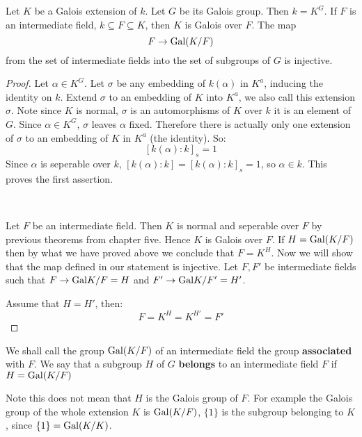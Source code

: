 \begin{theorem}
    Let $K$ be a Galois extension of $k$. Let $G$ be its Galois group. Then $k=K^G$. If $F$ is an intermediate field, $k\subseteq F\subseteq K$, then $K$ is Galois over $F$. The map\[F\rightarrow \text{Gal}(K/F)\]from the set of intermediate fields into the set of subgroups of $G$ is injective.

    \begin{proof}
        Let $\alpha\in K^G$. Let $\sigma$ be any embedding of $k(\alpha)$ in $K^a$, inducing the identity on $k$. Extend $\sigma$ to an embedding of $K$ into $K^a$, we also call this extension $\sigma$. Note since $K$ is normal, $\sigma$ is an automorphisms of $K$ over $k$ it is an element of $G$. Since $\alpha\in K^G$, $\sigma$ leaves $\alpha$ fixed. Therefore there is actually only one extension of $\sigma$ to an embedding of $K$ in $K^a$ (the identity). So:\[{[k(\alpha)\colon k]}_s = 1 \] 
        Since $\alpha$ is seperable over $k$, $[k(\alpha)\colon k] = {[k(\alpha)\colon k]}_s = 1$, so $\alpha\in k$. This proves the first assertion.

        \

        Let $F$ be an intermediate field. Then $K$ is normal and seperable over $F$ by previous theorems from chapter five. Hence $K$ is Galois over $F$. If $H = \text{Gal}(K/F)$ then by what we have proved above we conclude that $F = K^H$. Now we will show that the map defined in our statement is injective. Let $F,F'$ be intermediate fields such that $F\rightarrow \text{Gal}{K/F} = H$ and $F'\rightarrow \text{Gal}{K/F'} = H'$.

        Assume that $H=H'$, then:\begin{equation*}
            F = K^H = K^{H'} = F'
        \end{equation*}
    \end{proof}
\end{theorem} 
    \begin{definition}
        We shall call the group $\text{Gal}({K/F})$ of an intermediate field the group \textbf{associated} with $F$. We say that a subgroup $H$ of $G$ \textbf{belongs} to an intermediate field $F$ if $H = \text{Gal}({K/F})$
       \begin{bergman}
        Note this does not mean that $H$ is the Galois group of $F$. For example the Galois group of the whole extension $K$ is $\text{Gal}(K/F)$, $\{1\}$ is the subgroup belonging to $K$, since $\{1\} = \text{Gal}(K/K)$.
    \end{bergman}
    \end{definition}

